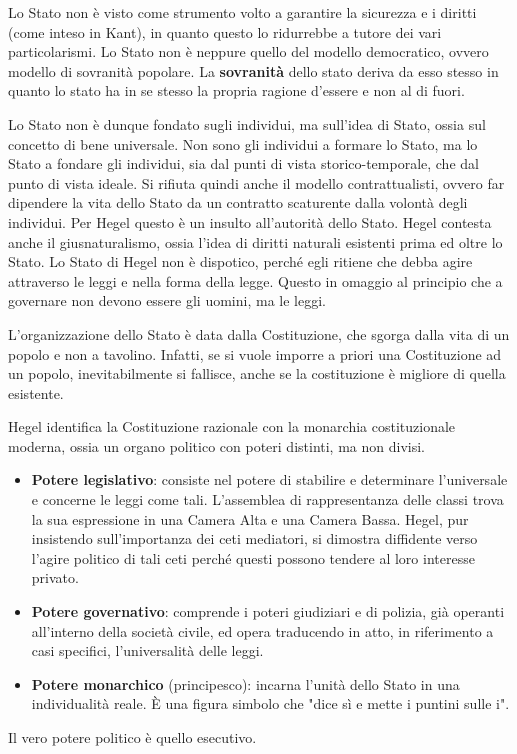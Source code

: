 \documentclass[a4paper, twoside, titlepage]{book}
\begin{document}
Lo Stato non è visto come strumento volto a garantire la sicurezza e i diritti (come inteso in Kant), in quanto questo lo ridurrebbe a tutore dei vari particolarismi.
Lo Stato non è neppure quello del modello democratico, ovvero modello di sovranità popolare. La \textbf{sovranità} dello stato deriva da esso stesso in quanto lo stato ha in se stesso la propria ragione d'essere e non al di fuori.

Lo Stato non è dunque fondato sugli individui, ma sull'idea di Stato, ossia sul concetto di bene universale. Non sono gli individui a formare lo Stato, ma lo Stato a fondare gli individui, sia dal punti di vista storico-temporale, che dal punto di vista ideale. Si rifiuta quindi anche il modello contrattualisti, ovvero far dipendere la vita dello Stato da un contratto scaturente dalla volontà degli individui.
Per Hegel questo è un insulto all'autorità dello Stato. Hegel contesta anche il giusnaturalismo, ossia l'idea di diritti naturali esistenti prima ed oltre lo Stato. Lo Stato di Hegel non è dispotico, perché egli ritiene che debba agire attraverso le leggi e nella forma della legge. Questo in omaggio al principio che a governare non devono essere gli uomini, ma le leggi.

L'organizzazione dello Stato è data dalla Costituzione, che sgorga dalla vita di un popolo e non a tavolino.
Infatti, se si vuole imporre a priori una Costituzione ad un popolo, inevitabilmente si fallisce, anche se la costituzione è migliore di quella esistente.

Hegel identifica la Costituzione razionale con la monarchia costituzionale moderna, ossia un organo politico con poteri distinti, ma non divisi.
\begin{itemize}
\item \textbf{Potere legislativo}: consiste nel potere di stabilire e determinare l'universale e concerne le leggi come tali. L'assemblea di rappresentanza delle classi trova la sua espressione in una Camera Alta e una Camera Bassa.
Hegel, pur insistendo sull'importanza dei ceti mediatori, si dimostra diffidente verso l'agire politico di tali ceti perché questi possono tendere al loro interesse privato.
\item \textbf{Potere governativo}: comprende i poteri giudiziari e di polizia, già operanti all'interno della società civile, ed opera traducendo in atto, in riferimento a casi specifici, l'universalità delle leggi.
\item \textbf{Potere monarchico} (principesco): incarna l'unità dello Stato in una individualità reale. È una figura simbolo che "dice sì e mette i puntini sulle i".
\end{itemize}
Il vero potere politico è quello esecutivo.
\end{document}
